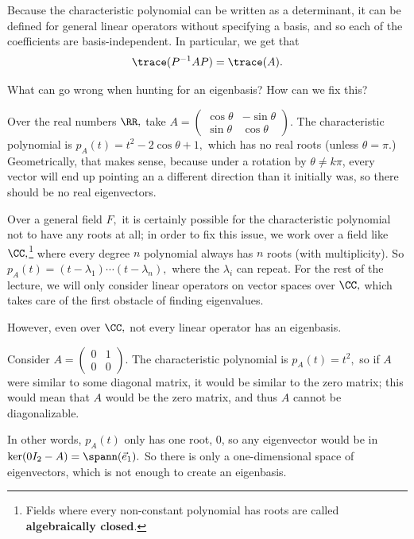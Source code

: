 

Because the characteristic polynomial can be written as a determinant, it can be defined for general linear operators without specifying a basis, and so each of the coefficients are basis-independent. In particular, we get that 
\[
\trace(P^{-1}AP) = \trace(A).
\]

\begin{qq}
What can go wrong when hunting for an eigenbasis? How can we fix this?
\end{qq}

\begin{example}
Over the real numbers $\RR,$ take $A = \begin{pmatrix}
\cos\theta & -\sin\theta \\
\sin\theta & \cos\theta
\end{pmatrix}$. The characteristic polynomial is $p_A(t) = t^2 - 2\cos\theta + 1,$ which has no real roots (unless $\theta = \pi$.) Geometrically, that makes sense, because under a rotation by $\theta \neq k\pi$, every vector will end up pointing an a different direction than it initially was, so there should be no real eigenvectors.
\end{example}

Over a general field $F,$ it is certainly possible for the characteristic polynomial not to have any roots at all; in order to fix this issue, we work over a field like $\CC,$\footnote{Fields where every non-constant polynomial has roots are called \textbf{algebraically closed}.} where every degree $n$ polynomial always has $n$ roots (with multiplicity). So $p_A(t) = (t - \lambda_1) \cdots (t - \lambda_n),$ where the $\lambda_i$ can repeat. For the rest of the lecture, we will only consider linear operators on vector spaces over $\CC,$ which takes care of the first obstacle of finding eigenvalues.

However, even over $\CC,$ not every linear operator has an eigenbasis. 
\begin{example}
Consider $A = \begin{pmatrix}
0 & 1 \\ 0 & 0
\end{pmatrix}$. The characteristic polynomial is $p_A(t) = t^2,$ so if $A$ were similar to some diagonal matrix, it would be similar to the zero matrix; this would mean that $A$ would be the zero matrix, and thus $A$ cannot be diagonalizable. 

In other words, $p_A(t)$ only has one root, 0, so any eigenvector would be in $\ker(0 I_2 - A) = \spann(\vec{e}_1).$ So there is only a one-dimensional space of eigenvectors, which is not enough to create an eigenbasis. 
\end{example}

